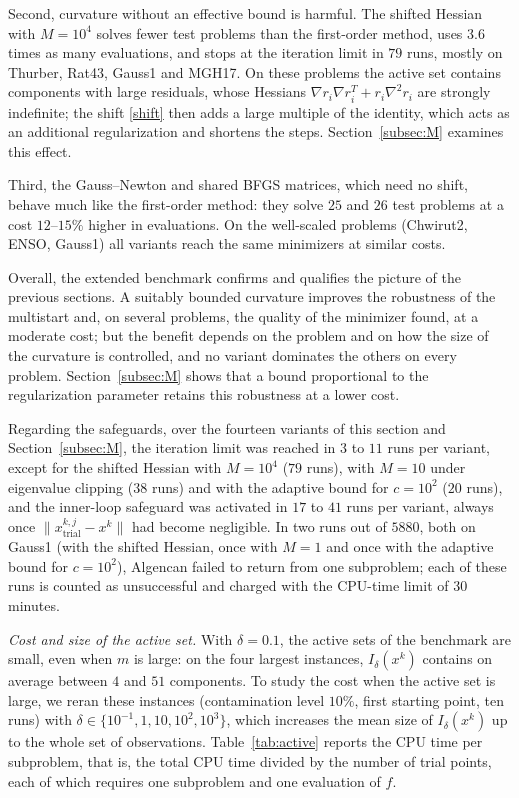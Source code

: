 \documentclass[11pt]{article}
\begin{document}
Second, curvature without an effective bound is harmful. The shifted Hessian
with $M=10^4$ solves fewer test problems than the first-order method, uses
$3.6$ times as many evaluations, and stops at the iteration limit in $79$ runs,
mostly on Thurber, Rat43, Gauss1 and MGH17. On these problems the active set
contains components with large residuals, whose Hessians
$\nabla r_i\nabla r_i^T + r_i\nabla^2 r_i$ are strongly indefinite; the shift
\eqref{shift} then adds a large multiple of the identity, which acts as an
additional regularization and shortens the steps. Section~\ref{subsec:M}
examines this effect.

Third, the Gauss--Newton and shared BFGS matrices, which need no shift, behave
much like the first-order method: they solve $25$ and $26$ test problems at a
cost $12$--$15\%$ higher in evaluations. On the well-scaled problems (Chwirut2,
ENSO, Gauss1) all variants reach the same minimizers at similar costs.

Overall, the extended benchmark confirms and qualifies the picture of the
previous sections. A suitably bounded curvature improves the robustness of the
multistart and, on several problems, the quality of the minimizer found, at a
moderate cost; but the benefit depends on the problem and on how the size of
the curvature is controlled, and no variant dominates the others on every
problem. Section~\ref{subsec:M} shows that a bound proportional to the
regularization parameter retains this robustness at a lower cost.

Regarding the safeguards, over the fourteen variants of this section and
Section~\ref{subsec:M}, the iteration limit was reached in $3$ to $11$ runs per
variant, except for the shifted Hessian with $M=10^4$ ($79$ runs), with $M=10$
under eigenvalue clipping ($38$ runs) and with the adaptive bound for
$c = 10^2$ ($20$ runs), and the inner-loop safeguard was activated in $17$ to
$41$ runs per variant, always once $\|x^{k,j}_{\mathrm{trial}} - x^k\|$ had
become negligible. In two runs out of $5880$, both on Gauss1 (with the shifted
Hessian, once with $M=1$ and once with the adaptive bound for $c = 10^2$),
Algencan failed to return from one subproblem; each of these runs is counted as
unsuccessful and charged with the CPU-time limit of $30$ minutes.


\emph{Cost and size of the active set.} With $\delta = 0.1$, the active sets
of the benchmark are small, even when $m$ is large: on the four largest
instances, $I_\delta(x^k)$ contains on average between $4$ and $51$
components. To study the cost when the active set is large, we reran these
instances (contamination level $10\%$, first starting point, ten runs) with
$\delta \in \{10^{-1}, 1, 10, 10^2, 10^3\}$, which increases the mean size of
$I_\delta(x^k)$ up to the whole set of observations. Table~\ref{tab:active}
reports the CPU time per subproblem, that is, the total CPU time divided by the
number of trial points, each of which requires one subproblem and one
evaluation of $f$.
\end{document}
